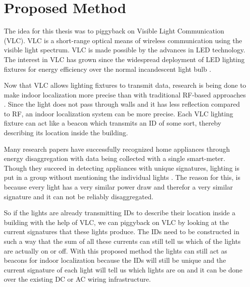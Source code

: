 	\section{Proposed Method}

	The idea for this thesis was to piggyback on Visible Light Communication (VLC).
	VLC is a short-range optical means of wireless communication using the visible light spectrum.
	VLC is made possible by the advances in LED technology.
	The interest in VLC has grown since the widespread deployment of LED lighting fixtures for energy efficiency over the normal incandescent light bulb \cite{rajagopal2012ieee}.


	Now that VLC allows lighting fixtures to transmit data, research is being done to make indoor localization more precise than with traditional RF-based approaches \cite{Kuo:2014:LIP:2639108.2639109}.
	Since the light does not pass through walls and it has less reflection compared to RF, an indoor localization system can be more precise.
	Each VLC lighting fixture can act like a beacon which transmits an ID of some sort, thereby describing its location inside the building.


	Many research papers have successfully recognized home appliances through energy disaggregation with data being collected with a single smart-meter.   
	Though they succeed in detecting appliances with unique signatures, lighting is put in a group without mentioning the individual lights \cite{kolter2011redd}.
	The reason for this, is because every light has a very similar power draw and therefor a very similar signature and it can not be reliably disaggregated.


	So if the lights are already transmitting IDs to describe their location inside a building with the help of VLC, we can piggyback on VLC by looking at the current signatures that these lights produce.
	The IDs need to be constructed in such a way that the sum of all these currents can still tell us which of the lights are actually on or off.
	With this proposed method the lights can still act as beacons for indoor localization because the IDs will still be unique and the current signature of each light will tell us which lights are on and it can be done over the existing DC or AC wiring infrastructure.


